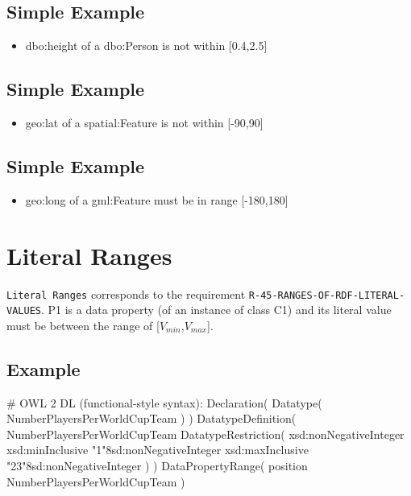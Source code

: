 \documentclass{llncs}
\newcommand{\ms}[1]{\texttt{#1}}
\begin{document}
\subsection{Simple Example}

\begin{itemize}
	\item dbo:height of a dbo:Person is not within [0.4,2.5]
\end{itemize}

\subsection{Simple Example}

\begin{itemize}
	\item geo:lat of a spatial:Feature is not within [-90,90]
\end{itemize}

\subsection{Simple Example}

\begin{itemize}
	\item geo:long of a gml:Feature must be in range [-180,180]
\end{itemize}

\section{Literal Ranges}

\ms{Literal Ranges} corresponds to the requirement
\ms{R-45-RANGES-OF-RDF-LITERAL-} \ms{VALUES}.
P1 is a data property (of an instance of class C1) and its literal value must be between the range of [$V_{min}$,$V_{max}$].

\subsection{Example}

\begin{ex}
# OWL 2 DL (functional-style syntax):
Declaration( Datatype( NumberPlayersPerWorldCupTeam ) ) 
DatatypeDefinition( 
    NumberPlayersPerWorldCupTeam
    DatatypeRestriction( 
        xsd:nonNegativeInteger 
        xsd:minInclusive "1"^^xsd:nonNegativeInteger 
        xsd:maxInclusive "23"^^xsd:nonNegativeInteger ) )     
DataPropertyRange( position NumberPlayersPerWorldCupTeam ) 
\end{ex}
\end{document}
